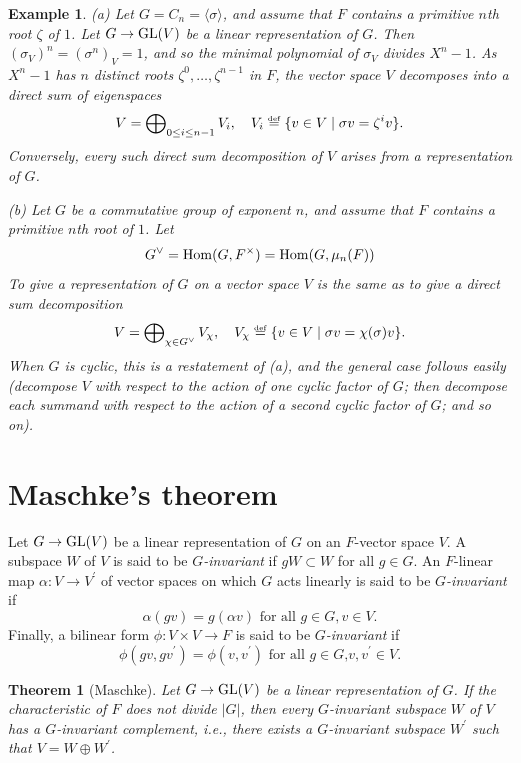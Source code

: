 \documentclass[a4paper,11pt,final,openany]{memoir}%
\newtheorem{theorem}[X]{Theorem}
\newtheorem{example}[X]{Example}
\theoremstyle{nonumberplain}
\begin{document}
\begin{example}
\label{r2}(a) Let $G=C_{n}=\langle\sigma\rangle$, and assume that $F$ contains
a primitive $n$th root $\zeta$ of $1$. Let $G\rightarrow\operatorname{GL}(V)$ be a linear
representation of $G$. Then $(\sigma_{V})^{n}=(\sigma^{n})_{V}=1$, and so the
minimal polynomial of $\sigma_{V}$ divides $X^{n}-1$. As $X^{n}-1$ has $n$
distinct roots $\zeta^{0},\ldots,\zeta^{n-1}$ in $F$, the vector space $V$
decomposes into a direct sum of eigenspaces%
\[
V=\bigoplus\nolimits_{0\leq i\leq n-1}V_{i},\quad V_{i}%
\overset{\df}{=}\{v\in V\mid\sigma v=\zeta^{i}v\}\text{.}%
\]
Conversely, every such direct sum decomposition of $V$ arises from a
representation of $G$.

(b) Let $G$ be a commutative group of exponent $n$, and assume that $F$
contains a primitive $n$th root of $1$. Let
\[
G^{\vee}=\operatorname{Hom}(G,F^{\times})=\operatorname{Hom}(G,\mu_{n}(F))
\]
To give a representation of $G$ on a vector space $V$ is the same as to give a
direct sum decomposition%
\[
V=\bigoplus\nolimits_{\chi\in G^{\vee}}V_{\chi},\quad V_{\chi}%
\overset{\df}{=}\{v\in V\mid\sigma v=\chi(\sigma)v\}\text{.}%
\]
When $G$ is cyclic, this is a restatement of (a), and the general case follows
easily (decompose $V$ with respect to the action of one cyclic factor of $G$;
then decompose each summand with respect to the action of a second cyclic
factor of $G$; and so on).
\end{example}

\section{Maschke's theorem}

Let $G\rightarrow\operatorname{GL}(V)$ be a linear representation of $G$ on an $F$-vector
space $V$. A subspace $W$ of $V$ is said to be $G$\emph{-invariant} if
$gW\subset W$ for all $g\in G$. An $F$-linear map $\alpha\colon V\rightarrow
V^{\prime}$ of vector spaces on which $G$ acts linearly is said to be
$G$\emph{-invariant} if
\[
\alpha(gv)=g(\alpha v)\text{ for all }g\in G,v\in V.
\]
Finally, a bilinear form $\phi\colon V\times V\rightarrow F$ is said to be
$G$\emph{-invariant} if%
\[
\phi(gv,gv^{\prime})=\phi(v,v^{\prime})\text{ for all }g\in G\text{,
}v,v^{\prime}\in V.
\]


\begin{theorem}
[Maschke]\label{r3}%
%
Let $G\rightarrow\operatorname{GL}(V)$ be a linear representation of $G$. If the
characteristic of $F$ does not divide $|G|$, then every $G$-invariant subspace
$W$ of $V$ has a $G$-invariant complement, i.e., there exists a $G$-invariant
subspace $W^{\prime}$ such that $V=W\oplus W^{\prime}$.
\end{theorem}
\end{document}
